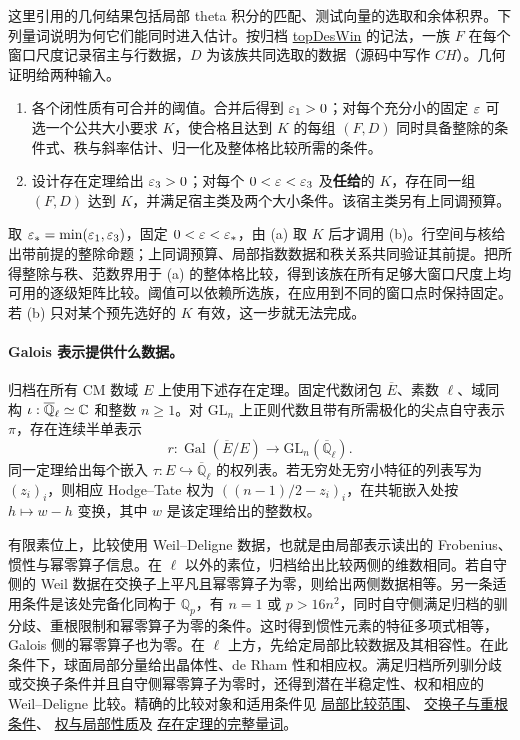 \documentclass[UTF8,fontset=none,a4paper,11pt]{ctexart}
\theoremstyle{definition}
\newcommand{\src}[3]{\href{https://github.com/leanprover-community/riemann-hypothesis/blob/23aebbb302010b292314d406aa97f7901d698634/src/#1.lean\#L#2}{#3}}
\begin{document}
这里引用的几何结果包括局部 theta 积分的匹配、测试向量的选取和余体积界。下列量词说明为何它们能同时进入估计。按归档
\src{Development/AutomorphicArithmetic/CharacterBoxes/DesWin}{11}{topDesWin}
的记法，一族 $F$ 在每个窗口尺度记录宿主与行数据，$D$ 为该族共同选取的数据（源码中写作 $CH$）。几何证明给两种输入。
\begin{enumerate}[label=(\alph*)]
\item 各个闭性质有可合并的阈值。合并后得到 $\varepsilon_1>0$；对每个充分小的固定 $\varepsilon$ 可选一个公共大小要求 $K$，使合格且达到 $K$ 的每组 $(F,D)$ 同时具备整除的条件式、秩与斜率估计、归一化及整体格比较所需的条件。
\item 设计存在定理给出 $\varepsilon_3>0$；对每个 $0<\varepsilon<\varepsilon_3$ 及\textbf{任给}的 $K$，存在同一组 $(F,D)$ 达到 $K$，并满足宿主类及两个大小条件。该宿主类另有上同调预算。
\end{enumerate}
取 $\varepsilon_*=\min(\varepsilon_1,\varepsilon_3)$，固定 $0<\varepsilon<\varepsilon_*$，由 (a) 取 $K$ 后才调用 (b)。行空间与核给出带前提的整除命题；上同调预算、局部指数数据和秩关系共同验证其前提。把所得整除与秩、范数界用于 (a) 的整体格比较，得到该族在所有足够大窗口尺度上均可用的逐级矩阵比较。阈值可以依赖所选族，在应用到不同的窗口点时保持固定。若 (b) 只对某个预先选好的 $K$ 有效，这一步就无法完成。

\paragraph{Galois 表示提供什么数据。}
归档在所有 CM 数域 $E$ 上使用下述存在定理。固定代数闭包 $\overline E$、素数 $\ell$、域同构 $\iota:\overline{\mathbb Q}_\ell\simeq\mathbb C$ 和整数 $n\ge1$。对 $\mathrm{GL}_n$ 上正则代数且带有所需极化的尖点自守表示 $\pi$，存在连续半单表示
\[
 r:\operatorname{Gal}(\overline E/E)\longrightarrow
                         \mathrm{GL}_n(\overline{\mathbb Q}_\ell).
\]
同一定理给出每个嵌入 $\tau:E\hookrightarrow\overline{\mathbb Q}_\ell$ 的权列表。若无穷处无穷小特征的列表写为 $(z_i)_i$，则相应 Hodge--Tate 权为 $((n-1)/2-z_i)_i$，在共轭嵌入处按 $h\mapsto w-h$ 变换，其中 $w$ 是该定理给出的整数权。

有限素位上，比较使用 Weil--Deligne 数据，也就是由局部表示读出的 Frobenius、惯性与幂零算子信息。在 $\ell$ 以外的素位，归档给出比较两侧的维数相同。若自守侧的 Weil 数据在交换子上平凡且幂零算子为零，则给出两侧数据相等。另一条适用条件是该处完备化同构于 $\mathbb Q_p$，有 $n=1$ 或 $p>16n^2$，同时自守侧满足归档的驯分歧、重根限制和幂零算子为零的条件。这时得到惯性元素的特征多项式相等，Galois 侧的幂零算子也为零。在 $\ell$ 上方，先给定局部比较数据及其相容性。在此条件下，球面局部分量给出晶体性、de Rham 性和相应权。满足归档所列驯分歧或交换子条件并且自守侧幂零算子为零时，还得到潜在半稳定性、权和相应的 Weil--Deligne 比较。精确的比较对象和适用条件见
\src{Development/AutomorphicArithmetic/Foundations/GaloisRepresentations/TypeConditions/WeightsConjBis}{25}{局部比较范围}、
\src{Development/AutomorphicArithmetic/Foundations/GaloisRepresentations/TypeConditions/WeightsConjAlt}{27}{交换子与重根条件}、
\src{Development/AutomorphicArithmetic/Foundations/GaloisRepresentations/TypeConditions/WeightsConjBis}{55}{权与局部性质}及
\src{Development/AutomorphicArithmetic/Foundations/GaloisRepresentations/TypeConditions/WeightsConjBis}{69}{存在定理的完整量词}。
\end{document}
